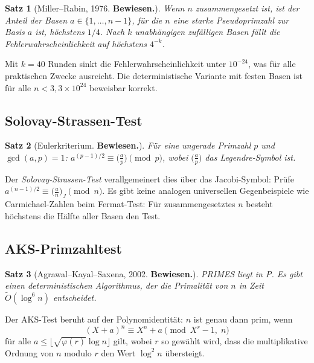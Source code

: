 \documentclass[12pt,a4paper]{amsart}
\newtheorem{theorem}{Satz}[section]
\theoremstyle{definition}
\begin{document}
\begin{theorem}[Miller--Rabin, 1976. \textbf{Bewiesen.}]
Wenn $n$ zusammengesetzt ist, ist der Anteil der Basen $a \in \{1,\ldots,n-1\}$,
für die $n$ eine starke Pseudoprimzahl zur Basis $a$ ist, höchstens $1/4$.
Nach $k$ unabhängigen zufälligen Basen fällt die Fehlerwahrscheinlichkeit auf
höchstens $4^{-k}$.
\end{theorem}

Mit $k = 40$ Runden sinkt die Fehlerwahrscheinlichkeit unter $10^{-24}$, was
für alle praktischen Zwecke ausreicht. Die deterministische Variante mit festen
Basen ist für alle $n < 3{,}3 \times 10^{24}$ beweisbar korrekt.

\subsection{Solovay-Strassen-Test}

\begin{theorem}[Eulerkriterium. \textbf{Bewiesen.}]
Für eine ungerade Primzahl $p$ und $\gcd(a,p)=1$:
$a^{(p-1)/2} \equiv \bigl(\frac{a}{p}\bigr) \pmod{p}$,
wobei $\bigl(\frac{a}{p}\bigr)$ das Legendre-Symbol ist.
\end{theorem}

Der \emph{Solovay-Strassen-Test} verallgemeinert dies über das Jacobi-Symbol:
Prüfe $a^{(n-1)/2} \equiv \bigl(\frac{a}{n}\bigr)_J \pmod{n}$. Es gibt keine
analogen universellen Gegenbeispiele wie Carmichael-Zahlen beim Fermat-Test:
Für zusammengesetztes $n$ besteht höchstens die Hälfte aller Basen den Test.

\subsection{AKS-Primzahltest}

\begin{theorem}[Agrawal--Kayal--Saxena, 2002. \textbf{Bewiesen.}]
\textit{PRIMES liegt in P.} Es gibt einen deterministischen Algorithmus, der
die Primalität von $n$ in Zeit $\tilde{O}(\log^6 n)$ entscheidet.
\end{theorem}

Der AKS-Test beruht auf der Polynomidentität: $n$ ist genau dann prim, wenn
\[
  (X+a)^n \equiv X^n + a \pmod{X^r - 1,\; n}
\]
für alle $a \le \lfloor\sqrt{\varphi(r)}\log n\rfloor$ gilt, wobei $r$ so
gewählt wird, dass die multiplikative Ordnung von $n$ modulo $r$ den Wert
$\log^2 n$ übersteigt.
\end{document}
